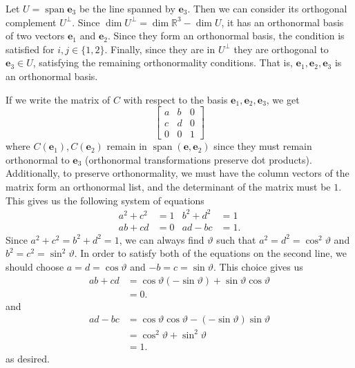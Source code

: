 \documentclass[12 pt, letterpaper]{hmcpset}
\begin{document}
\begin{solution}
\begin{enumerate}
			Let $U = \operatorname{span} \mathbf{e}_{3}$ be the line spanned by $\mathbf{e}_{3}$. Then we can consider its orthogonal complement $U^{\perp}$. Since $\operatorname{dim} U^{\perp} = \operatorname{dim} \mathbb{R}^{3} - \operatorname{dim} U$, it has an orthonormal basis of two vectors $\mathbf{e}_{1}$ and $\mathbf{e}_{2}$. Since they form an orthonormal basis, the condition is satisfied for $i, j \in \{ 1, 2 \}$. Finally, since they are in $U^{\perp}$ they are orthogonal to $\mathbf{e}_{3} \in U$, satisfying the remaining orthonormality conditions. That is, $\mathbf{e}_{1}, \mathbf{e}_{2}, \mathbf{e}_{3}$ is an orthonormal basis. 

			If we write the matrix of $C$ with respect to the basis $\mathbf{e}_{1}, \mathbf{e}_{2}, \mathbf{e}_{3}$, we get
			\[
				\begin{bmatrix}
					a & b & 0 \\
					c & d & 0 \\
					0 & 0 & 1
				\end{bmatrix}
			\]
			where $C(\mathbf{e}_{1}), C(\mathbf{e}_{2})$ remain in $\operatorname{span}(\mathbf{e}, \mathbf{e}_{2})$ since they must remain orthonormal to $\mathbf{e}_{3}$ (orthonormal transformations preserve dot products). Additionally, to preserve orthonormality, we must have the column vectors of the matrix form an orthonormal list, and the determinant of the matrix must be $1$. This gives us the following system of equations
			\[
				\begin{aligned}
					a^{2} + c^{2} & = 1 & b^{2} + d^{2} & = 1 \\
					ab + cd & = 0 & ad - bc & = 1.
				\end{aligned}
			\]
			Since $a^{2} + c^{2} = b^{2} + d^{2} = 1$, we can always find $\vartheta$ such that $a^{2} = d^{2} = \cos^{2}{\vartheta}$ and $b^{2} = c^{2} = \sin^{2}{\vartheta}$. In order to satisfy both of the equations on the second line, we should choose $a = d = \cos{\vartheta}$ and $-b = c = \sin{\vartheta}$. This choice gives us
			\[
				\begin{split}
					ab + cd & = \cos{\vartheta} (- \sin{\vartheta}) + \sin{\vartheta} \cos{\vartheta} \\
						& = 0.
				\end{split}
			\]
			and
			\[
				\begin{split}
					ad - bc & = \cos{\vartheta} \cos{\vartheta} - (- \sin{\vartheta}) \sin{\vartheta} \\
						& = \cos^{2}{\vartheta} + \sin^{2}{\vartheta} \\
						& = 1.
				\end{split}
			\]
			as desired.
	\end{enumerate}
\end{solution}
\end{document}

